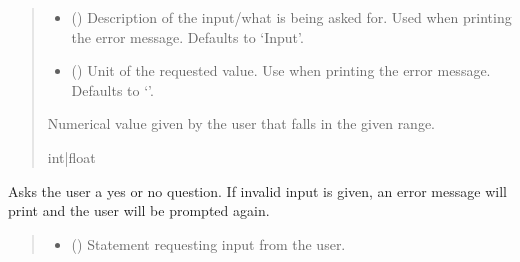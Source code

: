 \documentclass[letterpaper,10pt,english]{sphinxmanual}
\begin{document}
\begin{fulllineitems}
\begin{fulllineitems}
\begin{quote}
\begin{description}
\begin{itemize}
\item {} 
\sphinxAtStartPar
{} (\sphinxstyleliteralemphasis{\sphinxupquote{, }}) \textendash{} Description of the input/what is being asked for. Used when printing                 the error message. Defaults to ‘Input’.

\item {} 
\sphinxAtStartPar
{} (\sphinxstyleliteralemphasis{\sphinxupquote{, }}) \textendash{} Unit of the requested value. Use when printing the error message.                 Defaults to ‘’.

\end{itemize}

\sphinxAtStartPar
Numerical value given by the user that falls in the given range.

\sphinxAtStartPar
int|float

\end{description}\end{quote}

\end{fulllineitems}


\begin{fulllineitems}
\label{\detokenize{Setup.Inputs:Setup.Inputs.GetUserInput.UserInput.AskYN}}
\pysigstartsignatures
{}
\pysigstopsignatures
\sphinxAtStartPar
Asks the user a yes or no question. If invalid input is given, an error message will print and         the user will be prompted again.
\begin{quote}\begin{description}
\begin{itemize}
\item {} 
\sphinxAtStartPar
{} () \textendash{} Statement requesting input from the user.


\end{itemize}
\end{description}
\end{quote}
\end{fulllineitems}
\end{fulllineitems}
\end{document}
